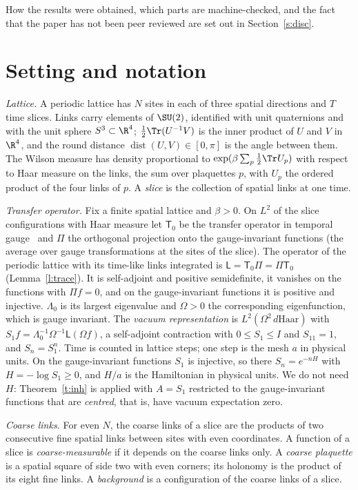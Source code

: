 How the results were obtained, which parts are machine-checked, and the fact that the paper has not been
peer reviewed are set out in Section~\ref{s:disc}.

\section{Setting and notation}\label{s:set}
\emph{Lattice.} A periodic lattice has $N$ sites in each of three spatial directions and $T$ time slices.
Links carry elements of $\SU(2)$, identified with unit quaternions and with the unit sphere $S^3\subset\R^4$;
$\tfrac12\Tr(U^{-1}V)$ is the inner product of $U$ and $V$ in $\R^4$, and the round distance
$\operatorname{dist}(U,V)\in[0,\pi]$ is the angle between them. The Wilson measure has density proportional
to $\exp(\beta\sum_p\tfrac12\Tr U_p)$ with respect to Haar measure on the links, the sum over plaquettes $p$,
with $U_p$ the ordered product of the four links of $p$. A \emph{slice} is the collection of spatial links at
one time.

\emph{Transfer operator.} Fix a finite spatial lattice and $\beta>0$. On $L^2$ of the slice configurations
with Haar measure let $\mathsf T_0$ be the transfer operator in temporal gauge~\cite{Lu77,OS78} and $\Pi$ the
orthogonal projection onto the gauge-invariant functions (the average over gauge transformations at the
sites of the slice). The operator of the periodic lattice with its time-like links integrated is
$\mathsf L=\mathsf T_0\Pi=\Pi\mathsf T_0$ (Lemma~\ref{l:trace}). It is self-adjoint and positive semidefinite, it
vanishes on the functions with $\Pi f=0$, and on the gauge-invariant functions it is positive and injective.
$\Lambda_0$ is its largest eigenvalue and $\Omega>0$ the corresponding eigenfunction, which is gauge invariant.
The \emph{vacuum representation} is $L^2(\Omega^2\,d\mathrm{Haar})$ with
$S_1f=\Lambda_0^{-1}\Omega^{-1}\mathsf L(\Omega f)$, a self-adjoint contraction with $0\le S_1\le I$ and $S_11=1$,
and $S_n=S_1^n$. Time is counted in lattice steps; one step is the mesh $a$ in physical units. On the
gauge-invariant functions $S_1$ is injective, so there $S_n=e^{-nH}$ with $H=-\log S_1\ge0$, and $H/a$ is the
Hamiltonian in physical units. We do not need $H$: Theorem~\ref{t:inh} is applied with $A=S_1$ restricted to the
gauge-invariant functions that are \emph{centred}, that is, have vacuum expectation zero.

\emph{Coarse links.} For even $N$, the coarse links of a slice are the products of two consecutive fine
spatial links between sites with even coordinates. A function of a slice is \emph{coarse-measurable} if it
depends on the coarse links only. A \emph{coarse plaquette} is a spatial square of side two with even corners;
its holonomy is the product of its eight fine links. A \emph{background} is a configuration of the coarse
links of a slice.

